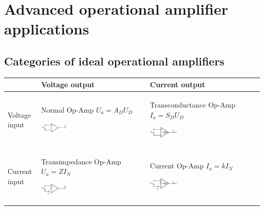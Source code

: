 \clearpage
\section{Advanced operational amplifier applications}

	\subsection{Categories of ideal operational amplifiers}
		\begin{table}[htbp]
			\centering
			\begin{tabularx}{0.9\linewidth}{lXX} \toprule
				& Voltage output & Current output \\ \midrule
					Voltage input 
				& 
					Normal Op-Amp \newline 
					$U_a = A_D U_D$ \newline 
					\begin{center}\includegraphics[width=0.25\textwidth]{images/NormalOPAMP.png}\end{center}  
				& 	Transconductance Op-Amp \newline 
					$I_a = S_D U_D$ \newline
					\begin{center}\includegraphics[width=0.25\textwidth]{images/TransconductanceOPAMP.png}\end{center}
				\\
					Current input 
				& 	Transimpedance Op-Amp \newline 
					$U_a = Z I_N$\newline
					\begin{center}\includegraphics[width=0.25\textwidth]{images/TransimpedanceOPAMP.png}\end{center}
				 & 	Current Op-Amp \newline 
				 	$I_a = k I_N$\newline
				 	\begin{center}\includegraphics[width=0.25\textwidth]{images/CurrentOPAMP.png}\end{center} \\ \bottomrule
			\end{tabularx}
		\end{table}
	
